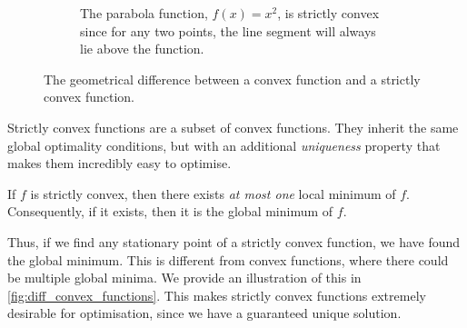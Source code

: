 \begin{figure}[h]
\begin{subfigure}[b]{0.48\linewidth}
        \caption{The parabola function, $f(x) = x^2$, is strictly convex since for any two points, the line segment will always lie above the function.}

        \label{fig:strict_convex_parabola}

    \end{subfigure}

    \caption{The geometrical difference between a convex function and a strictly convex function.}

    \label{fig:diff_geometric_convexity}

\end{figure}



Strictly convex functions are a subset of convex functions. They inherit the same global optimality conditions, but with an additional \textit{uniqueness} property that makes them incredibly easy to optimise.

\begin{definition}

    If $f$ is strictly convex, then there exists \textit{at most one} local minimum of $f$. Consequently, if it exists, then it is the global minimum of $f$.

\end{definition}

Thus, if we find any stationary point of a strictly convex function, we have found the global minimum. This is different from convex functions, where there could be multiple global minima. We provide an illustration of this in \cref{fig:diff_convex_functions}. This makes strictly convex functions extremely desirable for optimisation, since we have a guaranteed unique solution.




